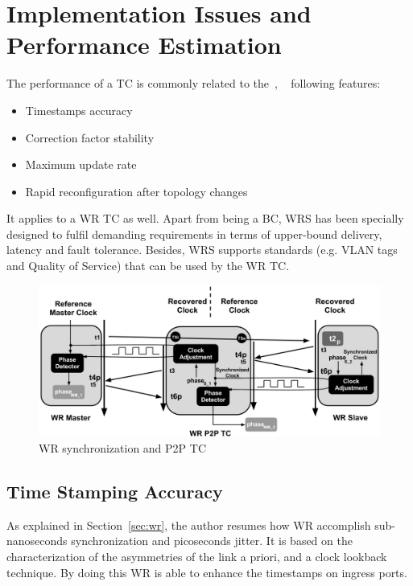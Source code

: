 \section{Implementation Issues and Performance Estimation}
\label{sec:issues}
The performance of a TC is commonly related to the~\cite{biblio:tc_perf},
~\cite{biblio:tc_perf_2} following features: 

\begin{itemize}
    \item Timestamps accuracy 
    \item Correction factor stability
    \item Maximum update rate
    \item Rapid reconfiguration after topology changes
\end{itemize}

It applies to a WR TC as well. Apart from being a BC, WRS has been
specially designed to fulfil demanding requirements in terms of upper-bound delivery, 
latency and fault tolerance. Besides, WRS supports standards (e.g. VLAN tags and Quality of Service) that 
can be used by the WR TC.

\begin{figure}[!t]
\centering
\includegraphics[scale=0.43]{fig/time_stamps_tc.png}
\caption{WR synchronization and P2P TC}
\label{fig:time_stamp}
\end{figure}


\subsection{Time Stamping Accuracy}

As explained in Section~\ref{sec:wr}, the author resumes how WR accomplish
sub-nanoseconds synchronization and picoseconds jitter. It is based on the
characterization of the asymmetries of the link a priori, and a clock lookback
technique. By doing this WR is able to  enhance the timestamps on ingress ports. 

